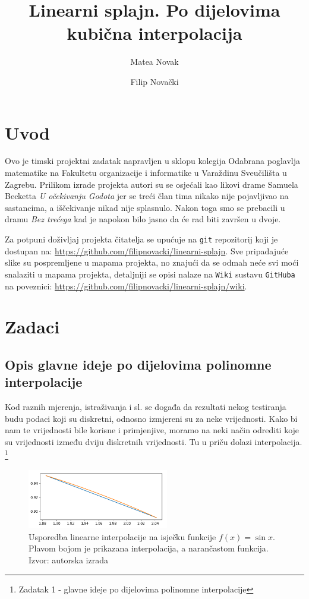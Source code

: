 \documentclass[12pt,a4paper]{report}
\author{Matea Novak \and Filip Novački}
\title{Linearni splajn. Po dijelovima kubična interpolacija}
\begin{document}
	\maketitle
	
	\tableofcontents
	
\chapter{Uvod}
	Ovo je timski projektni zadatak napravljen u sklopu kolegija Odabrana poglavlja matematike na Fakultetu organizacije i informatike u Varaždinu Sveučilišta u Zagrebu. Prilikom izrade projekta autori su se osjećali kao likovi drame Samuela Becketta \textit{U očekivanju Godota} jer se treći član tima nikako nije pojavljivao na sastancima, a iščekivanje nikad nije splasnulo. Nakon toga smo se prebacili u dramu \textit{Bez trećega} kad je napokon bilo jasno da će rad biti završen u dvoje.
	
	Za potpuni doživljaj projekta čitatelja se upućuje na \texttt{git} repozitorij koji je dostupan na: \url{https://github.com/filipnovacki/linearni-splajn}. Sve pripadajuće slike su pospremljene u mapama projekta, no znajući da se odmah neće svi moći snalaziti u mapama projekta, detaljniji se opisi nalaze na \texttt{Wiki} sustavu \texttt{GitHuba} na poveznici: \url{https://github.com/filipnovacki/linearni-splajn/wiki}.
\chapter{Zadaci}
	\section{Opis glavne ideje po dijelovima polinomne interpolacije}
	Kod raznih mjerenja, istraživanja i sl. se događa da rezultati nekog testiranja budu podaci koji su diskretni, odnosno izmjereni su za neke vrijednosti. Kako bi nam te vrijednosti bile korisne i primjenjive, moramo na neki način odrediti koje su vrijednosti između dviju diskretnih vrijednosti. Tu u priču dolazi interpolacija. \footnote{Zadatak 1 - glavne ideje po dijelovima polinomne interpolacije}
	
	\begin{figure}
		\includegraphics[width=0.55\textwidth]{slike/usporedba.png}
		\caption{Usporedba linearne interpolacije na isječku funkcije $f(x)=\sin x$. Plavom bojom je prikazana interpolacija, a narančastom funkcija. Izvor: autorska izrada}
		\label{usporedba}
	\end{figure}
	
\end{document}
